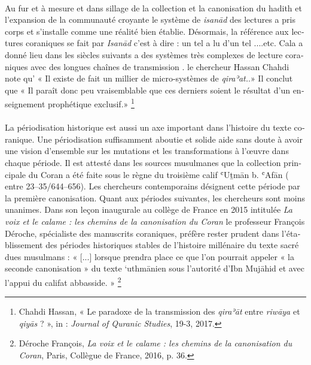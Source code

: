\documentclass[a4paper,12pt]{report}
\begin{document}
\begin{french}
\paragraph{}
Au fur et à mesure et dans sillage  de la collection et la canonisation du hadith et l'expansion de la communauté croyante  le  système de \textit{ isanād} des lectures  a pris corps et s'installe comme  une réalité bien établie. Désormais, la référence aux lectures coraniques se fait par \textit{Isanād} c'est à dire : un tel a lu d'un tel ....etc. Cala a donné lieu dans les siècles suivants a des systèmes très complexes de lecture coraniques avec des longues chaînes de transmission . le chercheur  Hassan Chahdi  note  qu'  «  Il existe de fait un millier de micro-systèmes de
\textit{qiraʾat.}.» Il conclut que « Il paraît donc peu vraisemblable que ces derniers soient le résultat d’un enseignement prophétique exclusif.» \footnote{   Chahdi Hassan,  « Le paradoxe de la transmission des \textit{qiraʾāt} entre \textit{riwāya} et \textit{qiyās} ? », in : \textit{Journal of Quranic Studies},  19-3, 2017.}

\paragraph{}
La  périodisation  historique est aussi un axe important  dans  l'histoire du texte coranique. Une périodisation suffisamment aboutie et solide aide sans doute à  avoir une vision d'ensemble sur les mutations et les transformations  à l'œuvre dans chaque période. Il est attesté dans les sources musulmanes que la  collection principale du Coran a été faite sous le règne du troisième calif ʿUṯm\=an  b. ʿAf\=an  ( entre 23–35/644–656). Les chercheurs contemporains désignent cette période par la première  canonisation. Quant aux périodes suivantes, les chercheurs sont moins unanimes. Dans son leçon inaugurale au collège de France en 2015 intitulée \textit{ La voix et le calame : les chemins de la canonisation du Coran} le professeur François Déroche, spécialiste des manuscrits coraniques,  préfère rester prudent dans l'établissement des périodes historiques stables de l'histoire millénaire du texte sacré dues musulmans :    
« [...] lorsque prendra place ce que l’on pourrait appeler « la seconde canonisation » du texte ‘uthmānien sous l’autorité d’Ibn Mujāhid et avec l’appui du califat abbasside. » \footnote { Déroche François, \textit{ La voix et le calame : les chemins de la canonisation du Coran}, Paris, Collègue de France, 2016, p. 36. }


\end{french}
\end{document}
